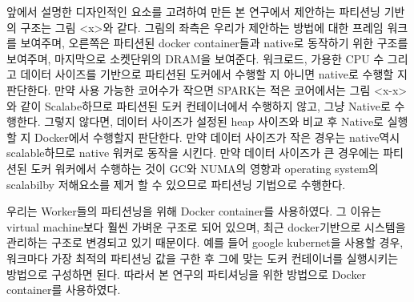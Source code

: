 \ifkor
앞에서 설명한 디자인적인 요소를 고려하여 만든
본 연구에서 제안하는 파티션닝 기반의 구조는 그림 <x>와 같다.
그림의 좌측은 우리가 제안하는 방법에 대한 프레임 워크를 보여주며, 오른쪽은 
파티션된 docker container들과 native로 동작하기 위한 구조를 보여주며, 마지막으로
소켓단위의 DRAM을 보여준다.
워크로드, 가용한 CPU 수 그리고 데이터 사이즈를 기반으로 파티션된 도커에서 수행할 지
아니면 native로 수행할 지 판단한다.
만약 사용 가능한 코어수가 작으면 SPARK는 적은 코어에서는 그림 <x-x>와 같이
Scalabe하므로 파티션된 도커 컨테이너에서 수행하지 않고, 그냥 Native로 수행한다.
그렇지 않다면, 데이터 사이즈가 설정된 heap 사이즈와 비교 후 Native로 실행 할 지
Docker에서 수행할지 판단한다.
만약 데이터 사이즈가 작은 경우는 native역시 scalable하므로 native 워커로 동작을 시킨다.
만약 데이터 사이즈가 큰 경우에는 파티션된 도커 워커에서 수행하는 것이 GC와 
NUMA의 영향과 operating system의 scalabilby 저해요소를 제거 할 수 있으므로 
파티션닝 기법으로 수행한다.
\else

\fi


\ifkor
우리는 Worker들의 파티션닝을 위해 Docker container를 사용하였다. 
그 이유는 virtual machine보다 훨씬 가벼운 구조로 되어 있으며, 
최근 docker기반으로 시스템을 관리하는 구조로 변경되고 있기 때문이다.
예를 들어 google kubernet을 사용할 경우, 워크마다 가장 최적의 파티션닝 값을 구한 후
그에 맞는 도커 컨테이너를 실행시키는 방법으로 구성하면 된다.
따라서 본 연구의 파티셔닝을 위한 방법으로 Docker container를 사용하였다.

\else

\fi


